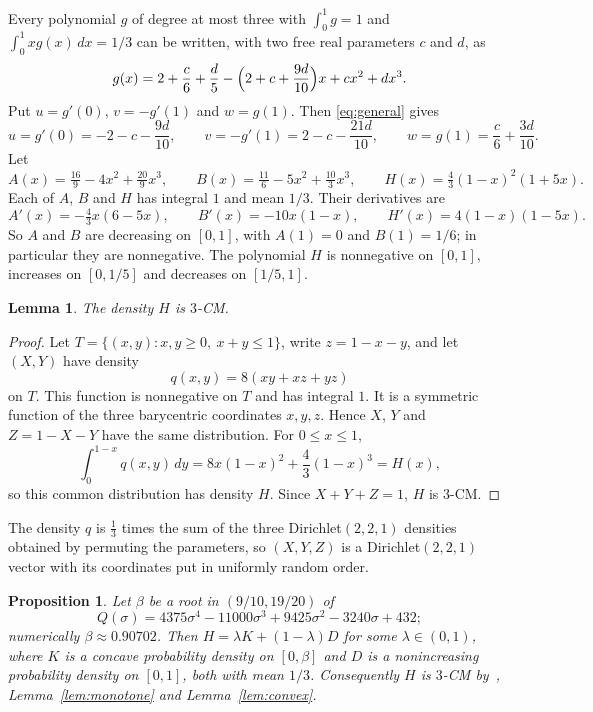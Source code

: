 \documentclass[11pt]{amsart}
\newtheorem{lemma}[theorem]{Lemma}
\newtheorem{proposition}[theorem]{Proposition}
\theoremstyle{remark}
\numberwithin{equation}{section}
\begin{document}
Every polynomial $g$ of degree at most three with $\int_0^1g=1$ and
$\int_0^1xg(x)\,dx=1/3$ can be written, with two free real parameters $c$
and $d$, as
\begin{equation}\label{eq:general}
g(x)=2+\frac c6+\frac d5-\Bigl(2+c+\frac{9d}{10}\Bigr)x+cx^2+dx^3.
\end{equation}
Put $u=g'(0)$, $v=-g'(1)$ and $w=g(1)$. Then \eqref{eq:general} gives
\begin{equation}\label{eq:uvw}
u=g'(0)=-2-c-\frac{9d}{10},\qquad v=-g'(1)=2-c-\frac{21d}{10},\qquad
w=g(1)=\frac c6+\frac{3d}{10}.
\end{equation}
Let
\[
A(x)=\tfrac{16}9-4x^2+\tfrac{20}9x^3,\qquad
B(x)=\tfrac{11}6-5x^2+\tfrac{10}3x^3,\qquad
H(x)=\tfrac43(1-x)^2(1+5x).
\]
Each of $A$, $B$ and $H$ has integral $1$ and mean $1/3$. Their derivatives are
\[
A'(x)=-\tfrac43x(6-5x),\qquad B'(x)=-10x(1-x),\qquad
H'(x)=4(1-x)(1-5x).
\]
So $A$ and $B$ are decreasing on $[0,1]$, with $A(1)=0$ and $B(1)=1/6$;
in particular they are nonnegative. The polynomial $H$ is nonnegative on
$[0,1]$, increases on $[0,1/5]$ and decreases on $[1/5,1]$.

\begin{lemma}\label{lem:H}
The density $H$ is $3$-CM.
\end{lemma}

\begin{proof}
Let $T=\{(x,y):x,y\ge0,\ x+y\le1\}$, write $z=1-x-y$, and let $(X,Y)$ have
density
\[
q(x,y)=8(xy+xz+yz)
\]
on $T$. This function is nonnegative on $T$ and has integral $1$. It is a
symmetric function of the three barycentric coordinates $x,y,z$. Hence
$X$, $Y$ and $Z=1-X-Y$ have the same distribution. For $0\le x\le1$,
\[
\int_0^{1-x}q(x,y)\,dy=8x(1-x)^2+\frac43(1-x)^3=H(x),
\]
so this common distribution has density $H$. Since $X+Y+Z=1$, $H$ is $3$-CM.
\end{proof}

The density $q$ is $\tfrac13$ times the sum of the three Dirichlet$(2,2,1)$
densities obtained by permuting the parameters, so $(X,Y,Z)$ is a
Dirichlet$(2,2,1)$ vector with its coordinates put in uniformly random
order.

\begin{proposition}\label{prop:mixture}
Let $\beta$ be a root in $(9/10,19/20)$ of
\[
Q(\sigma)=4375\sigma^4-11000\sigma^3+9425\sigma^2-3240\sigma+432;
\]
numerically $\beta\approx0.90702$. Then $H=\lambda K+(1-\lambda)D$ for
some $\lambda\in(0,1)$, where $K$ is a concave probability density on $[0,\beta]$ and
$D$ is a nonincreasing probability density on $[0,1]$, both with mean $1/3$.
Consequently $H$ is $3$-CM by~\cite[Theorem~4.2]{PWW12},
Lemma~\ref{lem:monotone} and Lemma~\ref{lem:convex}.
\end{proposition}
\end{document}
